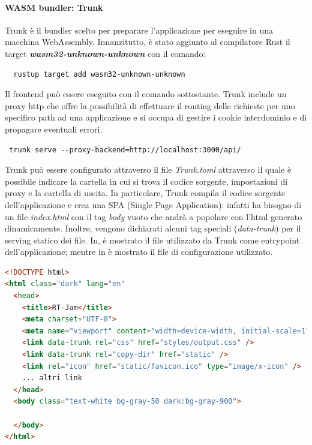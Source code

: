 \documentclass{article}
\begin{document}
\paragraph{WASM bundler: Trunk} Trunk è il bundler scelto per preparare 
l'applicazione per eseguire in una macchina WebAssembly. Innanzitutto, è stato 
aggiunto al compilatore Rust il target \textbf{\textit{wasm32-unknown-unknown}} con il
comando:

\begin{verbatim}
  rustup target add wasm32-unknown-unknown
\end{verbatim}

Il frontend può essere eseguito con il comando sottostante. Trunk include un proxy http che 
offre la possibilità di effettuare il routing delle richieste per uno specifico path ad 
una applicazione e si occupa di gestire i cookie interdominio e di propagare eventuali errori.

\begin{verbatim}
 trunk serve --proxy-backend=http://localhost:3000/api/ 
\end{verbatim}
Trunk può essere configurato attraverso il file \textit{Trunk.toml} attraverso il quale
è possibile indicare la cartella in cui si trova il codice sorgente, impostazioni di proxy 
e la cartella di uscita. In particolare, Trunk compila il codice sorgente dell'applicazione
e crea una SPA (Single Page Application): infatti ha bisogno di un file \textit{index.html}
con il tag \textit{body} vuoto che andrà a popolare con l'html generato dinamicamente. Inoltre,
vengono dichiarati alcuni tag speciali (\textit{data-trunk}) per il serving statico dei file. 
In,  è mostrato il file utilizzato da Trunk come entrypoint dell'applicazione; mentre in è 
mostrato il file di configurazione utilizzato.

\begin{lstlisting}[language=html, style=boxed, label={lst:wasm-entrypoint}, captionpos=b,caption={Entrypoint per applicazione WASM}]
<!DOCTYPE html>
<html class="dark" lang="en"
  <head>
    <title>RT-Jam</title>
    <meta charset="UTF-8">
    <meta name="viewport" content="width=device-width, initial-scale=1">
    <link data-trunk rel="css" href="styles/output.css" />
    <link data-trunk rel="copy-dir" href="static" />
    <link rel="icon" href="static/favicon.ico" type="image/x-icon" />
    ... altri link
  </head>
  <body class="text-white bg-gray-50 dark:bg-gray-900">
  
  </body>
</html>

\end{lstlisting}
\end{document}
